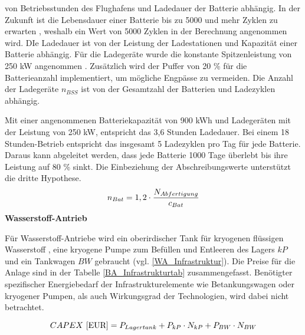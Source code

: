 von Betriebsstunden des Flughafens und Ladedauer der Batterie abhängig. 
In der Zukunft ist die Lebensdauer einer Batterie bis zu 5000 und mehr Zyklen zu erwarten \cite{reimers2018introduction}, 
weshalb ein Wert von 5000 Zyklen in der Berechnung angenommen wird.
DIe Ladedauer ist von der Leistung der Ladestationen und Kapazität einer Batterie abhängig.
Für die Ladegeräte wurde die konstante Spitzenleistung von 250 kW angenommen \cite{salucci2020optimal}. 
Zusätzlich wird der Puffer von 20 \% für die Batterieanzahl implementiert, um mögliche Engpässe zu vermeiden. 
Die Anzahl der Ladegeräte $n_{BSS}$ ist von der Gesamtzahl der Batterien und Ladezyklen abhängig.

Mit einer angenommenen Batteriekapazität von 900 kWh und Ladegeräten 
mit der Leistung von 250 kW, entspricht das 3,6 Stunden Ladedauer.
Bei einem 18 Stunden-Betrieb entspricht das insgesamt 5 Ladezyklen pro Tag für jede Batterie. 
Daraus kann abgeleitet werden, dass jede Batterie 1000 Tage überlebt bis ihre Leistung auf 80 \% sinkt.
Die Einbeziehung der Abschreibungswerte unterstützt die dritte Hypothese.
%
\begin{equation}
  {n_{Bat}} = {1,2} \cdot \frac{N_{Abfertigung}}{c_{Bat}}\\
  \label{BatAnzahl}
  \end{equation}
\textbf{Wasserstoff-Antrieb}
%

Für Wasserstoff-Antriebe wird ein oberirdischer Tank für kryogenen flüssigen Wasserstoff , 
eine kryogene Pumpe zum Befüllen und Entleeren des Lagers ${kP}$ 
und ein Tankwagen ${BW}$ gebraucht (vgl. \eqref{WA_Infrastruktur}). 
Die Preise für die Anlage sind in der Tabelle \ref{BA_Infrastrukturtab} zusammengefasst. 
%
Benötigter spezifischer Energiebedarf der Infrastrukturelemente wie Betankungswagen oder kryogener Pumpen,
als auch Wirkungsgrad der Technologien, wird dabei nicht betrachtet.

\begin{equation}
   {CAPEX ~[\text{EUR}]} = {P_{Lagertank}} + P_{kP} \cdot N_{kP} + P_{BW} \cdot N_{BW}  \\
   \label{WA_Infrastruktur}
\end{equation}

